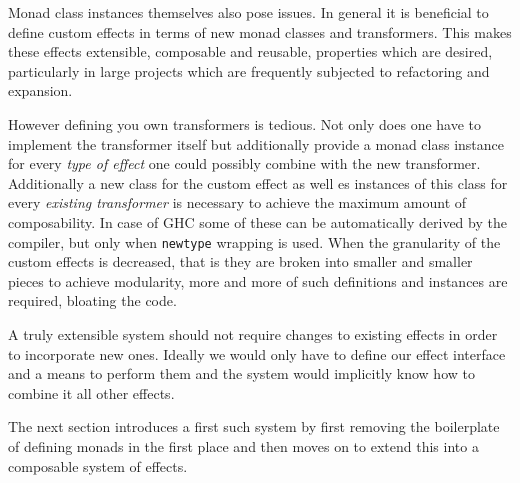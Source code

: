 Monad class instances themselves also pose issues. In general it is
beneficial to define custom effects in terms of new monad classes and
transformers. This makes these effects extensible, composable and
reusable, properties which are desired, particularly in large projects
which are frequently subjected to refactoring and expansion.

However defining you own transformers is tedious. Not only does one
have to implement the transformer itself but additionally provide a
monad class instance for every \emph{type of effect} one could possibly
combine with the new transformer. Additionally a new class for the
custom effect as well es instances of this class for every
\emph{existing transformer} is necessary to achieve the maximum amount
of composability. In case of GHC some of these can be automatically
derived by the compiler, but only when \texttt{newtype} wrapping is
used. When the granularity of the custom effects is decreased, that is
they are broken into smaller and smaller pieces to achieve modularity,
more and more of such definitions and instances are required, bloating
the code.

A truly extensible system should not require changes to existing
effects in order to incorporate new ones. Ideally we would only have
to define our effect interface and a means to perform them and the
system would implicitly know how to combine it all other effects.

The next section introduces a first such system by first removing the
boilerplate of defining monads in the first place and then moves on to
extend this into a composable system of effects.
